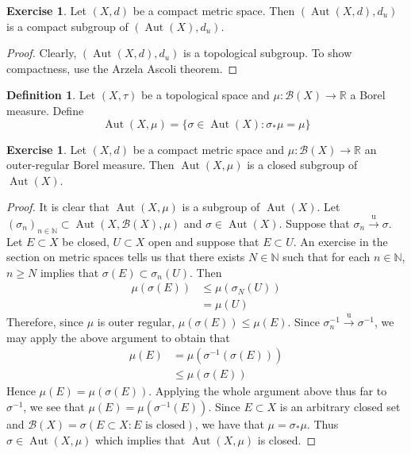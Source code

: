 \documentclass[12pt]{amsart}
\theoremstyle{definition}
\newtheorem{defn}[definition]{Definition}
\newtheorem{ex}[definition]{Exercise}
\newcommand{\sig}{\sigma}
\newcommand{\N}{\mathbb{N}}
\newcommand{\R}{\mathbb{R}}
\newcommand{\MB}{\mathcal{B}}
\newcommand{\convt}[1]{\xrightarrow{\text{#1}}}
\DeclareMathOperator{\Aut}{Aut}
\newcommand{\lex}[1]{\label{ex:#1}}
\newcommand{\ld}[1]{\label{defn:#1}}
\begin{document}
	\begin{ex} \lex{}
	Let $(X, d)$ be a compact metric space. Then $(\Aut(X, d), d_u)$ is a compact subgroup of $(\Aut(X), d_u)$.
	\end{ex}
	
	\begin{proof}
	Clearly, $(\Aut(X, d), d_u)$ is a topological subgroup. To show compactness, use the Arzela Ascoli theorem.
	\end{proof}
	
	\begin{defn} \ld{}
	Let $(X, \tau)$ be a topological space and $\mu: \MB(X) \rightarrow \R$ a Borel measure. Define $$\Aut(X, \mu) = \{\sig \in \Aut(X): \sig_* \mu = \mu\}$$ 
	\end{defn}	
	
	\begin{ex} \lex{}
	Let $(X,d)$ be a compact metric space and $\mu: \MB(X) \rightarrow \R$ an outer-regular Borel measure. Then $\Aut(X, \mu)$ is a closed subgroup of $\Aut(X)$.
	\end{ex}
	
	\begin{proof}
	It is clear that $\Aut(X, \mu)$ is a subgroup of $\Aut(X)$. Let $(\sig_n)_{n \in \N} \subset \Aut(X, \MB(X), \mu)$ and $\sig \in \Aut(X)$. Suppose that $\sig_n \convt{u} \sig$. Let $E \subset X$ be closed, $U \subset X$ open and suppose that $E \subset U$. An exercise in the section on metric spaces tells us that there exists $N \in \N$ such that for each $n \in \N$, $n \geq N$ implies that $\sig(E) \subset \sig_n(U)$. Then 
	\begin{align*}
	\mu(\sig(E)) 
	&\leq \mu(\sig_N(U)) \\
	&= \mu(U) 
	\end{align*}
	Therefore, since $\mu$ is outer regular, $\mu(\sig(E)) \leq \mu(E)$. Since $\sig_n^{-1} \convt{u} \sig^{-1}$, we may apply the above argument to obtain that 
	\begin{align*}
	\mu(E) 
	&= \mu(\sig^{-1}(\sig (E))) \\
	&\leq  \mu(\sig(E))
\end{align*}	 
Hence $\mu(E) = \mu(\sig(E))$. Applying the whole argument above thus far to $\sig^{-1}$, we see that $\mu(E) = \mu(\sig^{-1}(E))$. Since $E \subset X$ is an arbitrary closed set and $\MB(X) = \sig(E \subset X: E \text{ is closed})$, we have that $\mu = \sig_*\mu$. Thus $\sig \in \Aut(X, \mu)$ which implies that $\Aut(X, \mu)$ is closed. 
	\end{proof}
	
\end{document}

